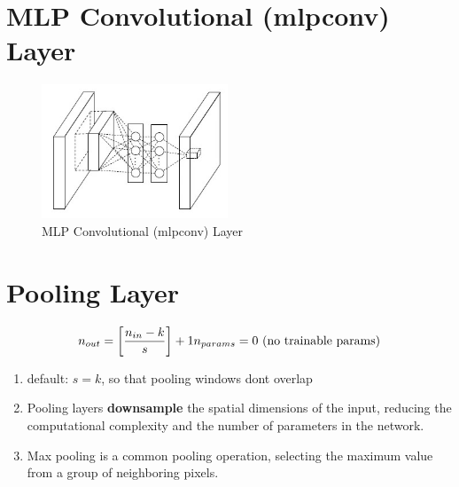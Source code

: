 
\section{MLP Convolutional (mlpconv) Layer \cite{medium/towardsdatascience.com/review-nin-network-in-network-image-classification-69e271e499ee}}

\begin{figure}[h]
    \centering
    \includegraphics[width=\linewidth, height=4cm, keepaspectratio]{Pictures/layers/conv-layer-mlp.jpg}
    \caption{MLP Convolutional (mlpconv) Layer}
\end{figure}




\section{Pooling Layer \cite{gfg-convolutional-neural-network-cnn-in-machine-learning}}\label{nn: Pooling Layer}

\[
   \displaystyle n_{out} = \left[ \dfrac{n_{in} - k}{s} \right] + 1
   \hfill
   n_{params} = 0 \text{ (no trainable params)}
\]

\begin{enumerate}
    \item default: $s=k$, so that pooling windows dont overlap

    \item Pooling layers \textbf{downsample} the spatial dimensions of the input, reducing the computational complexity and the number of parameters in the network. 
    
    \item Max pooling is a common pooling operation, selecting the maximum value from a group of neighboring pixels.

\end{enumerate}


